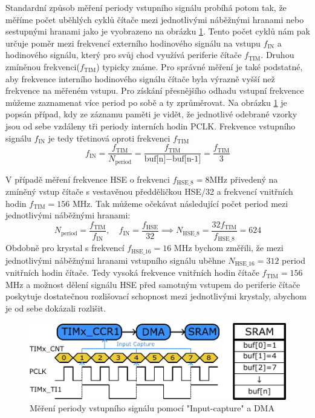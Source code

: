 Standardní způsob měření periody vstupního signálu probíhá potom tak, že měříme počet uběhlých cyklů čítače mezi jednotlivými náběžnými hranami nebo sestupnými hranami jako je vyobrazeno na obrázku \ref{fig:PeriodMeasurement}. Tento počet cyklů nám pak určuje poměr mezi frekvencí externího hodinového signálu na vstupu $	f_{\text{IN}}$ a hodinového signálu, který pro svůj chod využívá periferie čítače $	f_{\text{TIM}}$. Druhou zmíněnou frekvenci($f_{\text{TIM}}$) typicky známe. Pro správné měření je také podstatné, aby frekvence interního hodinového signálu čítače byla výrazně vyšší než frekvence na měřeném vstupu. Pro získání přesnějšího odhadu vstupní frekvence můžeme zaznamenat více period po sobě a ty  zprůměrovat. Na obrázku \ref{fig:PeriodMeasurement} je popsán případ, kdy ze záznamu paměti je vidět, že jednotlivé odebrané vzorky jsou od sebe vzdáleny tři periody interních hodin PCLK. Frekvence vstupního signálu $f_{\text{IN}}$ je tedy třetinová oproti frekvenci $f_{\text{TIM}}$
\begin{equation}
	f_{\text{IN}}=\frac{f_{\text{TIM}}}{N_\text{period}}=\frac{f_{\text{TIM}}}{\text{buf[n]}-\text{buf[n-1]}}=\frac{f_{\text{TIM}}}{3}
\end{equation}

V případě měření frekvence HSE o frekvenci $f_{\text{HSE\_8}}=8 \text{MHz}$ přivedený na zmíněný vstup čítače s vestavěnou předděličkou HSE/32 a frekvencí vnitřních hodin $f_{\text{TIM}}=156$ MHz. Tak můžeme  očekávat následující počet period mezi jednotlivými náběžnými hranami:
\begin{equation}
N_\text{period}=\frac{f_{\text{TIM}}}{f_{\text{IN}}},\quad f_{\text{IN}}=\frac{f_{\text{HSE}}}{32} \implies N_\text{HSE\_8}=\frac{32 f_{\text{TIM}}}{f_{\text{HSE\_8}}}= 624
\end{equation}
Obdobně pro krystal s frekvencí $f_{\text{HSE\_16}}=16 \text{ MHz}$ bychom změřili, že mezi jednotlivými náběžnými hranami vstupního signálu uběhne $N_\text{HSE\_16}= 312$ period vnitřních hodin čítače. Tedy vysoká frekvence vnitřních hodin čítače  $f_{\text{TIM}}=156$ MHz a možnost dělení signálu HSE před samotným vstupem do periferie čítače poskytuje dostatečnou rozlišovací schopnost mezi jednotlivými krystaly, abychom je od sebe dokázali rozlišit.
     

\begin{figure}[H]
	\centering
	\includegraphics[width=0.8\linewidth]{Figs/Diagrams/SVG/InputCapturePeriodMeasure.pdf}
	\caption{Měření periody vstupního signálu pomocí "Input-capture" a DMA}
	\label{fig:PeriodMeasurement}
\end{figure}

